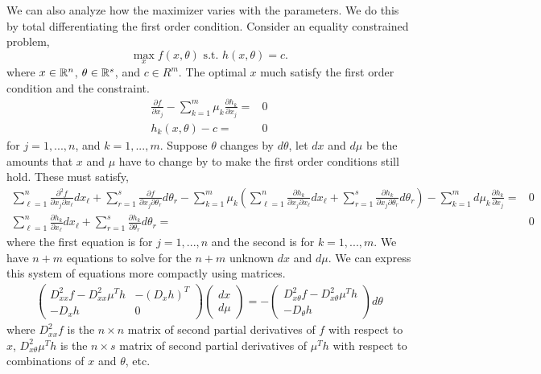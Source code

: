 We can also analyze how the maximizer varies with the parameters. We
do this by total differentiating the first order condition. Consider
an equality constrained problem,
\[ \max_x f(x,\theta) \text{ s.t. } h(x,\theta) = c. \] 
where $x \in \mathbb{R}^n$, $\theta \in \mathbb{R}^s$, and $c \in R^m$.
The optimal $x$ much satisfy the first order condition and the
constraint.
\begin{align*}
  \frac{\partial f}{\partial x_j} - \sum_{k=1}^m \mu_k \frac{\partial
    h_k}{\partial x_j} = & 0 \\
  h_k(x,\theta) - c = & 0 
\end{align*}
for $j = 1,..., n$, and $k=1,...,m$. Suppose $\theta$ changes by
$d\theta$, let $dx$ and $d\mu$ be the amounts that $x$ and $\mu$
have to change by to make the first order conditions still hold. These
must satisfy,
\begin{align*}
  \sum_{\ell=1}^n \frac{\partial^2 f}{\partial x_j \partial x_\ell}
  dx_\ell + \sum_{r=1}^s \frac{\partial f}{\partial x_j \partial
    \theta_r} d\theta_r - \sum_{k=1}^m \mu_k \left( \sum_{\ell=1}^n
    \frac{\partial h_k}{\partial x_j \partial x_\ell} dx_\ell +
    \sum_{r=1}^s \frac{\partial h_k}{\partial x_j \partial \theta_r}
    d\theta_r \right) - \sum_{k=1}^m d\mu_k \frac{\partial
    h_k}{\partial x_j} = & 0  \\
  \sum_{\ell = 1}^n \frac{\partial h_k}{\partial x_\ell} dx_\ell +
  \sum_{r=1}^s \frac{\partial h_k}{\partial \theta_r} d\theta_r = & 0
\end{align*}
where the first equation is for $j = 1,..., n$ and the second is for
$k = 1, ..., m$. We have $n+m$ equations to solve for the $n + m$
unknown $dx$ and $d\mu$. We can express this system of equations more
compactly using matrices.
\begin{align*}
  \begin{pmatrix} D^2_{xx} f - D^2_{xx} \mu^T h  & -(D_x h)^T \\
    -D_x h & 0 
  \end{pmatrix} 
  \begin{pmatrix}
    dx \\ d\mu
  \end{pmatrix} 
  =  -\begin{pmatrix} D^2_{x\theta} f - D^2_{x\theta} \mu^T h \\
    -D_\theta h \end{pmatrix} d\theta
\end{align*}
where $D^2_{xx} f$ is the $n \times n$ matrix of second partial
derivatives of $f$ with respect to $x$, $D^2_{x\theta} \mu^T h$ is the
$n \times s$ matrix of second partial derivatives of $\mu^Th$ with
respect to combinations of $x$ and $\theta$, etc. 

